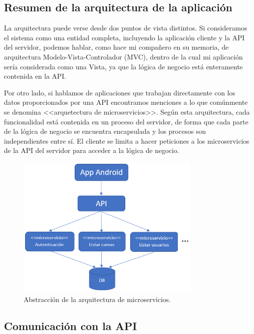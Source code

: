 \subsection{Resumen de la arquitectura de la aplicación}

La arquitectura puede verse desde dos puntos de vista distintos. Si consideramos el sistema como una entidad completa, incluyendo la aplicación cliente y la API del servidor, podemos hablar, como hace mi compañero en su memoria, de arquitectura Modelo-Vista-Controlador (MVC), dentro de la cual mi aplicación sería considerada como una Vista, ya que la lógica de negocio está enteramente contenida en la API. 

Por otro lado, si hablamos de aplicaciones que trabajan directamente con los datos proporcionados por una API encontramos menciones a lo que comúnmente se denomina <<arquetectura de microservicios>>. Según esta arquitectura, cada funcionalidad está contenida en un proceso del servidor, de forma que cada parte de la lógica de negocio se encuentra encapsulada y los procesos son independientes entre sí. El cliente se limita a hacer peticiones a los microservicios de la API del servidor para acceder a la lógica de negocio. 

\begin{figure}[H]
	\centering
	\includegraphics[width=0.8\textwidth]{../img/microservicios.png}
	\caption{Abstracción de la arquitectura de microservicios.}
	\label{fig:microservicios}
\end{figure}

\subsection{Comunicación con la API}

